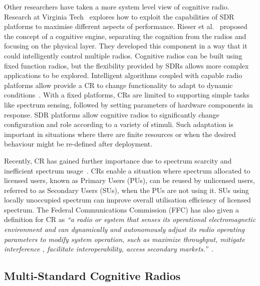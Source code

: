 Other researchers have taken a more system level view of cognitive radio.
Research at Virginia Tech~\cite{MacKenzie2009} explores how to exploit the capabilities of SDR platforms to maximise different aspects of performance. Rieser et al.~\cite{Rieser2007,Rondeau2004} proposed the concept of a cognitive engine, separating the cognition from the radios and focusing on the physical layer. They developed this component in a way that it could intelligently control multiple radios.
Cognitive radios can be built using fixed function radios, but the flexibility provided by SDRs allows more complex applications to be explored.
Intelligent algorithms coupled with capable radio platforms allow provide a CR to change functionality to adapt to dynamic conditions~\cite{MacKenzie2009}.
With a fixed platforms, CRs are limited to supporting simple tasks like spectrum sensing, followed by setting parameters of hardware components in response. SDR platforms allow cognitive radios to significantly change configuration and role according to a variety of stimuli. Such adaptation is important in situations where there are finite resources or when the desired behaviour might be re-defined after deployment.

Recently, CR has gained further importance due to spectrum scarcity and inefficient spectrum usage~\cite{FCC2002,Ghasemi2008}.
CRs enable a situation where spectrum allocated to licensed users, known as Primary Users (PUs), can be reused by unlicensed users, referred to as Secondary Users (SUs), when the PUs are not using it.
SUs using locally unoccupied spectrum can improve overall utilisation efficiency of licensed spectrum. The Federal Communications Commission (FFC) has also given a definition for CR as \emph{``a radio or system that senses its operational electromagnetic environment and can dynamically and autonomously adjust its radio operating parameters to modify system operation, such as maximize throughput, mitigate interference , facilitate interoperability, access secondary markets.''}~\cite{FCC2005}.

\subsection{Multi-Standard Cognitive Radios}

